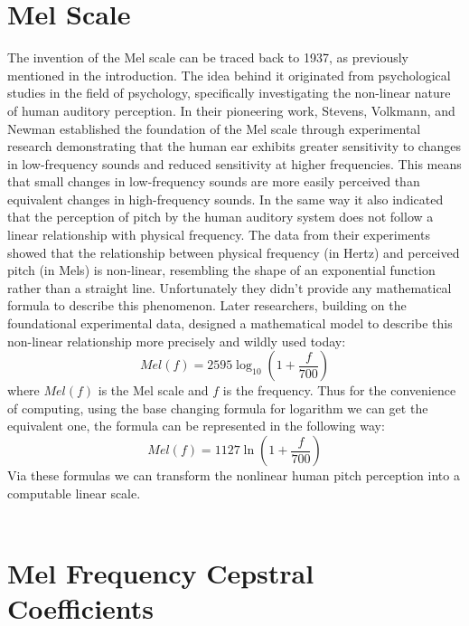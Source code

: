 \section{Mel Scale}

The invention of the Mel scale can be traced back to 1937, as previously mentioned in the introduction. The idea behind it originated from psychological studies in the field of psychology, specifically investigating the non-linear nature of human auditory perception. In their pioneering work, Stevens, Volkmann, and Newman established the foundation of the Mel scale through experimental research demonstrating that the human ear exhibits greater sensitivity to changes in low-frequency sounds and reduced sensitivity at higher frequencies. This means that small changes in low-frequency sounds are more easily perceived than equivalent changes in high-frequency sounds. In the same way it also indicated that the perception of pitch by the human auditory system does not follow a linear relationship with physical frequency. The data from their experiments showed that the relationship between physical frequency (in Hertz) and perceived pitch (in Mels) is non-linear, resembling the shape of an exponential function rather than a straight line. Unfortunately they didn't provide any mathematical formula to describe this phenomenon. Later researchers, building on the foundational experimental data, designed a mathematical model to describe this non-linear relationship more precisely and wildly used today:\\
\begin{equation}
   Mel(f)=2595\log_{10}(1+\frac{f}{700}) \label{Mel Scale}
\end{equation}
where $Mel(f)$ is the Mel scale and $f$ is the frequency. Thus for the convenience of computing, using the base changing formula for logarithm we can get the equivalent one, the formula can be represented in the following way: \\
\begin{equation}
   Mel(f)=1127\ln(1+\frac{f}{700})
\end{equation}
Via these formulas we can transform the nonlinear human pitch perception into a computable linear scale.\\
\\

\section{Mel Frequency Cepstral Coefficients}

